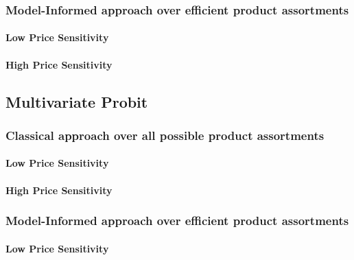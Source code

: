 

\subsubsection{Model-Informed approach over efficient product assortments}

\paragraph{Low Price Sensitivity}



\paragraph{High Price Sensitivity}



\subsection{Multivariate Probit}

\subsubsection{Classical approach over all possible product assortments}

\paragraph{Low Price Sensitivity}



\paragraph{High Price Sensitivity}



\subsubsection{Model-Informed approach over efficient product assortments}

\paragraph{Low Price Sensitivity}


